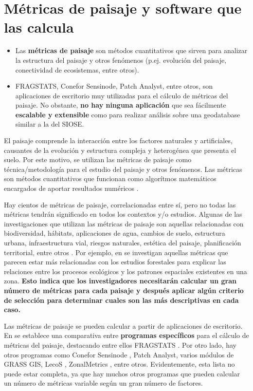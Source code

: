 \section{Métricas de paisaje y software que las calcula}\label{sec:metrica}

\begin{graybox}
\begin{itemize}
\item Las \textbf{métricas de paisaje} son métodos cuantitativos que sirven para analizar la estructura del paisaje y otros fenómenos (p.ej. evolución del paisaje, conectividad de ecosistemas, entre otros).
\item FRAGSTATS, Conefor Sensinode, Patch Analyst, entre otros, son aplicaciones de escritorio muy utilizadas para el cálculo de métricas del paisaje. No obstante, \textbf{no hay ninguna aplicación} que sea fácilmente \textbf{escalable y extensible} como para realizar análisis sobre una geodatabase similar a la del SIOSE.
\end{itemize}
\end{graybox}

El paisaje comprende la interacción entre los factores naturales y artificiales, causantes de la evolución y estructura compleja y heterogénea que presenta el suelo. Por este motivo, se utilizan las métricas de paisaje como técnica/metodología para el estudio del paisaje y otros fenómenos. Las métricas son métodos cuantitativos que funcionan como algorítmos matemáticos encargados de aportar resultados numéricos \citep{Gine2014}.

Hay cientos de métricas de paisaje, correlacionadas entre sí, pero no todas las métricas tendrán significado en todos los contextos y/o estudios. Algunas de las investigaciones que utilizan las métricas de paisaje son aquellas relacionadas con biodiversidad, hábitats, aplicaciones de agua, cambios de suelo, estructura urbana, infraestructura vial, riesgos naturales, estética del paisaje, planificación territorial, entre otros \citep{Uuemaa2009}. Por ejemplo, en \citet{Uuemaa2017} se investigan aquellas métricas que parecen estar más relacionadas con los estudios forestales para explicar las relaciones entre los procesos ecológicos y los patrones espaciales existentes en una zona. \textbf{Esto indica que los investigadores necesitarán calcular un gran número de métricas para cada paisaje y después aplicar algún criterio de selección para determinar cuales son las más descriptivas en cada caso.}

Las métricas de paisaje se pueden calcular a partir de aplicaciones de escritorio. En \citet{Zaragozi2012} se establece una comparativa entre \textbf{programas específicos} para el cálculo de métricas del paisaje, destacando entre ellos FRAGSTATS \citep{McGarigal1994,McGarigal2015}. Por otro lado, hay otros programas como Conefor Sensinode \citep{Saura2009}, Patch Analyst, varios módulos de GRASS GIS, LecoS \citep{Jung2016}, ZonalMetrics \citep{Adamczyk2017}, entre otros. Evidentemente, esta lista no puede estar completa, ya que hay muchos otros programas que pueden calcular un número de métricas variable según un gran número de factores.


